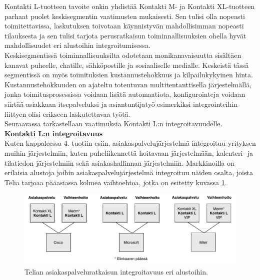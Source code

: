 \documentclass[finnish,12pt,a4paper,pdftex]{article}
\begin{document}
Kontakti L-tuotteen tavoite onkin yhdistää Kontakti M- ja Kontakti XL-tuotteen parhaat puolet keskisegmentin vaatimusten mukaisesti. Sen tulisi olla nopeasti toimitettavissa, laskutuksen toivotaan käynnistyvän mahdollisimman nopeasti tilauksesta ja sen tulisi tarjota perusratkaisun toiminnallisuuksien ohella hyvät mahdollisuudet eri alustoihin integroitumisessa.\\

Keskisegmentissä toiminnallisuuksilta odotetaan monikanavaisuutta sisältäen kanavat puheelle, chatille, sähköpostille ja sosiaaliselle medialle. Keskeistä tässä segmentissä on myös toimituksien kustannustehokkuus ja kilpailukykyinen hinta. Kustannustehokkuuden on ajateltu toteutuvan multitentanttisella järjestelmällä, jonka toimitusprosessissa voidaan lisätä automaatiota, konfigurointeja voidaan siirtää asiakkaan itsepalveluksi ja asiantuntijatyö esimerkiksi integrointeihin liittyen olisi erikseen laskutettavaa työtä.\\

Seuraavassa tarkastellaan vaatimuksia Kontakti L:n integroitavuudelle.\\

\textbf{Kontakti L:n integroitavuus}\\

Kuten kappaleessa 4. tuotiin esiin, asiakaspalvelujärjestelmä integroituu yrityksen muihin järjestelmiin, kuten puheliikennettä hoitavaan järjestelmään, kalenteri- ja tilatiedon järjestelmiin sekä asiakashallinnan järjestelmiin. Markkinoilla on erilaisia alustoja joihin asiakaspalvelujärjestelmä integroituu näiden osalta, joista Telia tarjoaa pääasiassa kolmea vaihtoehtoa, jotka on esitetty kuvassa \ref{fig:palvelumal}.\\

\begin{figure}[!h]
    \centering
    \includegraphics[scale=0.7]{images/integroitavuus.pdf}
    \caption{Telian asiakaspalveluratkaisun integroitavuus eri alustoihin.}
    \label{fig:palvelumal}
\end{figure}
\end{document}
